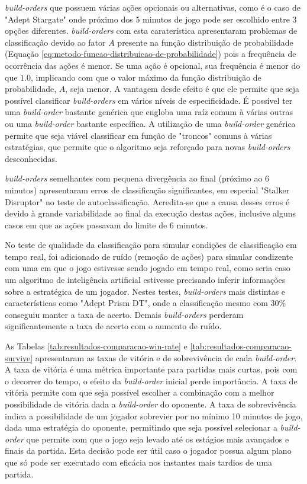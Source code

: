 \textit{\Glspl{build-order}} que possuem várias ações opcionais ou alternativas, como é o caso de "Adept Stargate" onde próximo dos 5 minutos de jogo pode ser escolhido entre 3 opções diferentes. \textit{\Glspl{build-order}} com esta caraterística apresentaram problemas de classificação devido ao fator $A$ presente na função distribuição de probabilidade (Equação \ref{eq:metodo-funcao-distribuicao-de-probabilidade}) pois a frequência de ocorrência das ações é menor. Se uma ação é opcional, sua frequência é menor do que $1.0$, implicando com que o valor máximo da função distribuição de probabilidade, $A$, seja menor. A vantagem desde efeito é que ele permite que seja possível classificar \textit{\glspl{build-order}} em vários níveis de especificidade. É possível ter uma \textit{\gls{build-order}} bastante genérica que engloba uma raíz comum à várias outras ou uma \textit{\gls{build-order}} bastante específica. A utilização de uma \textit{\gls{build-order}} genérica permite que seja viável classificar em função de "troncos" comuns à várias estratégias, que permite que o algoritmo seja reforçado para novas \textit{\glspl{build-order}} desconhecidas.

\textit{\Glspl{build-order}} semelhantes com pequena divergência ao final (próximo ao 6 minutos) apresentaram erros de classificação significantes, em especial "Stalker Disruptor" no teste de autoclassificação. Acredita-se que a causa desses erros é devido à grande variabilidade ao final da execução destas ações, inclusive alguns casos em que as ações passavam do limite de 6 minutos.

No teste de qualidade da classificação para simular condições de classificação em tempo real, foi adicionado de ruído (remoção de ações) para simular condizente com uma em que o jogo estivesse sendo jogado em tempo real, como seria caso um algoritmo de inteligência artificial estivesse precisando inferir informações sobre a estratégica de um jogador. Nestes testes, \textit{\glspl{build-order}} mais distintas e características como "Adept Prism DT", onde a classificação mesmo com 30\% conseguiu manter a taxa de acerto. Demais \textit{\glspl{build-order}} perderam significantemente a taxa de acerto com o aumento de ruído.

As Tabelas \ref{tab:resultados-comparacao-win-rate} e \ref{tab:resultados-comparacao-survive} apresentaram as taxas de vitória e de sobrevivência de cada \textit{\gls{build-order}}. A taxa de vitória é uma métrica importante para partidas mais curtas, pois com o decorrer do tempo, o efeito da \textit{\gls{build-order}} inicial perde importância. A taxa de vitória permite com que seja possível escolher a combinação com a melhor possibilidade de vitória dada a \textit{\gls{build-order}} do oponente. A taxa de sobrevivência indica a possibilidade de um jogador sobrevier por no mínimo 10 minutos de jogo, dada uma estratégia do oponente, permitindo que seja possível selecionar a \textit{\gls{build-order}} que permite com que o jogo seja levado até os estágios mais avançados e finais da partida. Esta decisão pode ser útil caso o jogador possua algum plano que só pode ser executado com eficácia nos instantes mais tardios de uma partida.

